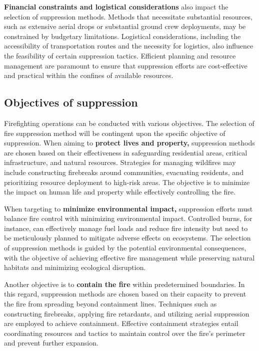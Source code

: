 \documentclass[
  12 pt,
]{Nemilov}
\begin{document}
\textbf{Financial constraints and logistical considerations} also impact the selection of suppression methods. Methods that necessitate substantial resources, such as extensive aerial drops or substantial ground crew deployments, may be constrained by budgetary limitations. Logistical considerations, including the accessibility of transportation routes and the necessity for logistics, also influence the feasibility of certain suppression tactics. Efficient planning and resource management are paramount to ensure that suppression efforts are cost-effective and practical within the confines of available resources.

\subsection{Objectives of suppression}\label{objectives-of-suppression}

Firefighting operations can be conducted with various objectives. The selection of fire suppression method will be contingent upon the specific objective of suppression. When aiming to \textbf{protect lives and property,} suppression methods are chosen based on their effectiveness in safeguarding residential areas, critical infrastructure, and natural resources. Strategies for managing wildfires may include constructing firebreaks around communities, evacuating residents, and prioritizing resource deployment to high-risk areas. The objective is to minimize the impact on human life and property while effectively controlling the fire.

When targeting to \textbf{minimize environmental impact,} suppression efforts must balance fire control with minimizing environmental impact. Controlled burns, for instance, can effectively manage fuel loads and reduce fire intensity but need to be meticulously planned to mitigate adverse effects on ecosystems. The selection of suppression methods is guided by the potential environmental consequences, with the objective of achieving effective fire management while preserving natural habitats and minimizing ecological disruption.

Another objective is to \textbf{contain the fire} within predetermined boundaries. In this regard, suppression methods are chosen based on their capacity to prevent the fire from spreading beyond containment lines. Techniques such as constructing firebreaks, applying fire retardants, and utilizing aerial suppression are employed to achieve containment. Effective containment strategies entail coordinating resources and tactics to maintain control over the fire's perimeter and prevent further expansion.
\end{document}
